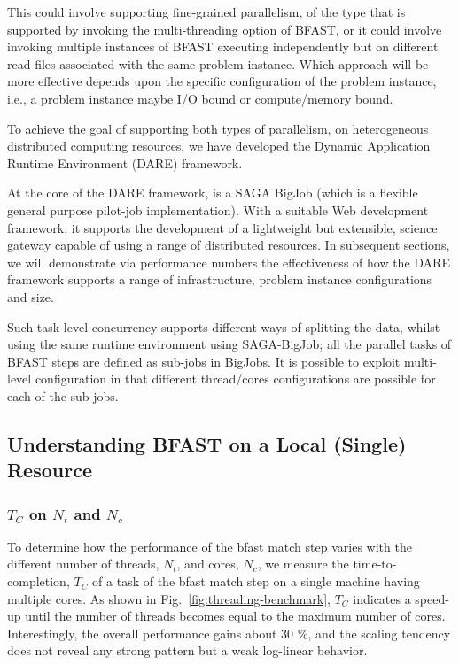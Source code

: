 \documentclass{cpeauth}
\begin{document}
This could involve supporting fine-grained parallelism, of the type
that is supported by invoking the multi-threading option of BFAST, or
it could involve invoking multiple instances of BFAST executing
independently but on different read-files associated with the same
problem instance. Which approach will be more effective depends upon
the specific configuration of the problem instance, i.e., a problem
instance maybe I/O bound or compute/memory bound.

To achieve the goal of supporting both types of parallelism, on
heterogeneous distributed computing resources, we have developed the
Dynamic Application Runtime Environment (DARE)
framework\cite{dareurl,dare-tg11,dare-ecmls11}.

At the core of the DARE framework, is a SAGA BigJob (which is a
flexible general purpose pilot-job
implementation)\cite{saga-ccgrid10,saga-royalsoc,saga-web,jha2009developing,ecmls10}.
With a suitable Web development framework, it supports the development
of a lightweight but extensible, science gateway capable of using a
range of distributed resources.  In subsequent sections, we will
demonstrate via performance numbers the effectiveness of how the DARE
framework supports a range of infrastructure, problem instance
configurations and size.

Such task-level concurrency supports different ways of splitting the
data, whilst using the same runtime environment using SAGA-BigJob; all
the parallel tasks of BFAST steps are defined as sub-jobs in BigJobs.
It is possible to exploit multi-level configuration in that different
thread/cores configurations are possible for each of the sub-jobs.

\subsection{Understanding BFAST on a Local (Single) Resource}

\subsubsection{$T_{C}$ on $N_t$ and $N_c$}

To determine how the performance of the bfast match step varies with
the different number of threads, $N_t$, and cores, $N_c$, we measure
the time-to-completion, $T_C$ of a task of the bfast match step on a
single machine having multiple cores.  As shown in
Fig.~\ref{fig:threading-benchmark}, $T_{C}$ indicates a speed-up until
the number of threads becomes equal to the maximum number of cores.
Interestingly, the overall performance gains about 30 \%, and the
scaling tendency does not reveal any strong pattern but a weak
log-linear behavior. 
\end{document}
